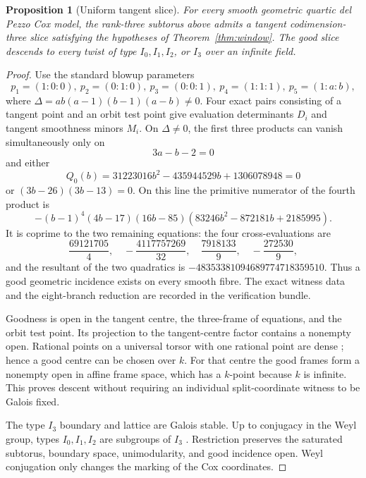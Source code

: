 \documentclass[11pt]{article}
\newtheorem{proposition}[theorem]{Proposition}
\theoremstyle{remark}
\begin{document}
\begin{proposition}[Uniform tangent slice]
\label{prop:slice}
%
%
%
%
For every smooth geometric quartic del Pezzo Cox model, the rank-three
subtorus above admits a tangent codimension-three slice satisfying the
hypotheses of Theorem~\ref{thm:window}.  The good slice descends to every
twist of type \(I_0,I_1,I_2\), or \(I_3\) over an infinite field.
\end{proposition}

\begin{proof}
Use the standard blowup parameters
\[
 p_1=(1:0:0),\ p_2=(0:1:0),\ p_3=(0:0:1),\
 p_4=(1:1:1),\ p_5=(1:a:b),
\]
where
\(\Delta=ab(a-1)(b-1)(a-b)\ne0\).  Four exact pairs consisting of a tangent
point and an orbit test point give evaluation determinants \(D_i\) and
tangent smoothness minors \(M_i\).  On \(\Delta\ne0\), the first three
products can vanish simultaneously only on
\[
 3a-b-2=0
\]
and either
\[
 Q_0(b)=31223016b^2-435944529b+1306078948=0
\]
or \((3b-26)(3b-13)=0\).  On this line the primitive numerator of the fourth
product is
\[
 -(b-1)^4(4b-17)(16b-85)
 (83246b^2-872181b+2185995).
\]
It is coprime to the two remaining equations: the four cross-evaluations are
\[
 \frac{69121705}{4},\quad-\frac{4117757269}{32},\quad
 \frac{7918133}{9},\quad-\frac{272530}{9},
\]
and the resultant of the two quadratics is
\(-48353381094689774718359510\).  Thus a good geometric incidence exists on
every smooth fibre.  The exact witness data and the eight-branch reduction
are recorded in the verification bundle.

Goodness is open in the tangent centre, the three-frame of equations, and
the orbit test point.  Its projection to the tangent-centre factor contains
a nonempty open.  Rational points on a universal torsor with one rational
point are dense \cite[Lemma~2.1]{TZ}; hence a good centre can be chosen over
\(k\).  For that centre the good frames form a nonempty open in affine frame
space, which has a \(k\)-point because \(k\) is infinite.  This proves descent
without requiring an individual split-coordinate witness to be Galois fixed.

The type \(I_3\) boundary and lattice are Galois stable.  Up to conjugacy in
the Weyl group, types \(I_0,I_1,I_2\) are subgroups of \(I_3\)
\cite[Lemma~4.2]{TZ}.  Restriction preserves the saturated subtorus, boundary
space, unimodularity, and good incidence open.  Weyl conjugation only changes
the marking of the Cox coordinates.
%
%
\end{proof}
\end{document}
